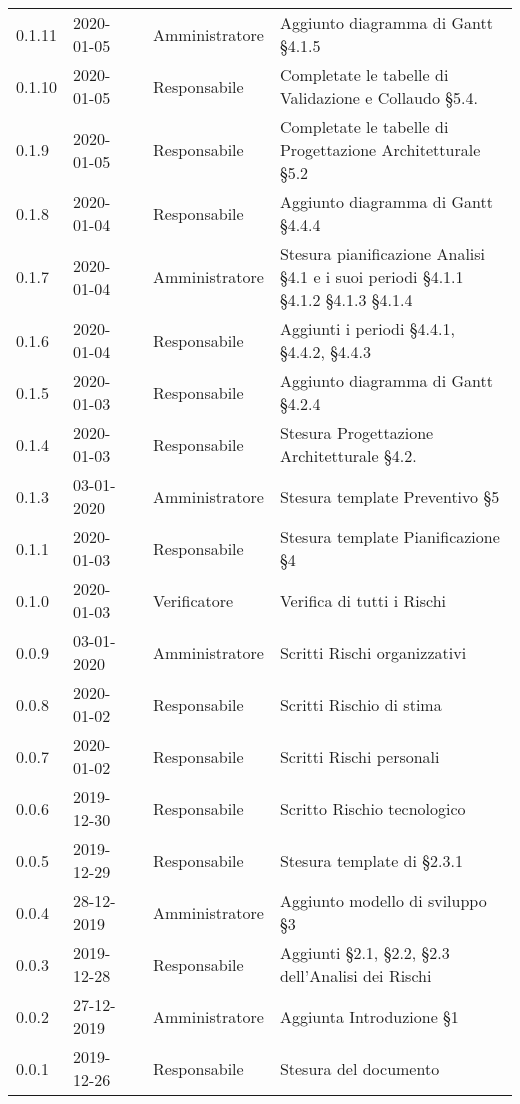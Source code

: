 {\begin{longtable}{C{2cm} C{2cm}  C{3cm}  C{3cm} C{4.5cm}}
0.1.11 & 2020-01-05 & \LD{} & Amministratore & Aggiunto diagramma di Gantt §4.1.5 \\
0.1.10 & 2020-01-05 & \SE{} & Responsabile & Completate le tabelle di Validazione e Collaudo §5.4.\\
0.1.9 & 2020-01-05 & \SE{} & Responsabile & Completate le tabelle di Progettazione Architetturale §5.2\\
0.1.8 & 2020-01-04 & \SE{} & Responsabile & Aggiunto diagramma di Gantt §4.4.4 \\
0.1.7 & 2020-01-04 & \LD{} & Amministratore & Stesura pianificazione Analisi §4.1 e i suoi periodi §4.1.1 §4.1.2 §4.1.3 §4.1.4 \\
0.1.6 & 2020-01-04 & \SE{} & Responsabile & Aggiunti i periodi §4.4.1, §4.4.2, §4.4.3\\
0.1.5 & 2020-01-03 & \SE{} & Responsabile & Aggiunto diagramma di Gantt §4.2.4\\
0.1.4 & 2020-01-03 & \SE{} & Responsabile & Stesura Progettazione Architetturale §4.2.\\
0.1.3 & 03-01-2020 & \LD{} & Amministratore & Stesura template Preventivo §5\\
0.1.1 & 2020-01-03 &  \SE{} & Responsabile & Stesura template Pianificazione §4\\
0.1.0 & 2020-01-03 &\AT{} & Verificatore & Verifica di tutti i Rischi  \\
0.0.9 & 03-01-2020 & \LD{} & Amministratore & Scritti Rischi organizzativi \\
0.0.8 & 2020-01-02 &  \SE{} & Responsabile & Scritti Rischio di stima \\
0.0.7 & 2020-01-02 & \SE{} & Responsabile & Scritti Rischi personali \\
0.0.6 & 2019-12-30 & \SE{} & Responsabile & Scritto Rischio tecnologico \\
0.0.5 & 2019-12-29 & \SE{} & Responsabile & Stesura template di §2.3.1\\
0.0.4 & 28-12-2019 & \LD{} & Amministratore & Aggiunto modello di sviluppo §3\\
0.0.3 & 2019-12-28 & \SE{} & Responsabile & Aggiunti §2.1, §2.2, §2.3 dell'Analisi dei Rischi \\
0.0.2 & 27-12-2019 & \LD{} & Amministratore & Aggiunta Introduzione §1 \\
0.0.1 & 2019-12-26 & \SE{} & Responsabile & Stesura del documento  \\
		
\end{longtable}
}